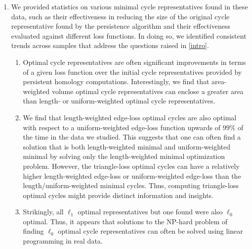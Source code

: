 \begin{enumerate}
    \item We provided statistics on various minimal cycle representatives found in these data, such as their effectiveness in reducing the size of the original cycle representative found by the persistence algorithm and their effectiveness evaluated against different loss functions. In doing so, we identified consistent trends across samples that address the questions raised in \se \ref{intro}.
    \begin{enumerate}
        \item Optimal cycle representatives are often significant improvements in terms of a given loss function over the initial cycle representatives provided by persistent homology computations. Interestingly, we find that area-weighted volume optimal cycle representatives can enclose a greater area than length- or uniform-weighted optimal cycle representatives. %
        
        
        
        \item We find that length-weighted edge-loss optimal cycles are also optimal with respect to a uniform-weighted edge-loss function upwards of $99\%$ of the time in the data we studied. This suggests that one can often find a solution that is both length-weighted minimal and uniform-weighted minimal by solving only the length-weighted minimal optimization problem. However, the triangle-loss optimal cycles can have a relatively higher length-weighted edge-loss or uniform-weighted edge-loss than the length/uniform-weighted minimal cycles. Thus, computing triangle-loss optimal cycles might provide distinct information and insights. 
        \item Strikingly, all $\ell_1$ optimal representatives but one found were also $\ell_0$ optimal. Thus, it appears that solutions to the NP-hard problem of finding $\ell_0$ optimal cycle representatives can often be solved using linear programming in real data.
    \end{enumerate}
    


\end{enumerate}


